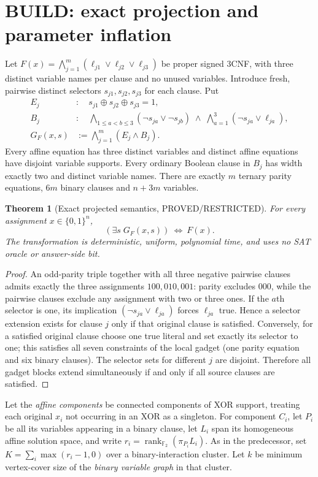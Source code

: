 \documentclass[11pt]{article}
\newtheorem{theorem}{Theorem}
\newcommand{\Ftwo}{\mathbb F_2}
\begin{document}
\section{BUILD: exact projection and parameter inflation}
Let $F(x)=\bigwedge_{j=1}^{m}(\ell_{j1}\lor\ell_{j2}\lor\ell_{j3})$ be proper signed 3CNF, with three distinct variable names per clause and no unused variables. Introduce fresh, pairwise distinct selectors $s_{j1},s_{j2},s_{j3}$ for each clause. Put
\begin{align}
E_j&:\quad s_{j1}\oplus s_{j2}\oplus s_{j3}=1,\\
B_j&:\quad\bigwedge_{1\le a<b\le3}(\neg s_{ja}\lor\neg s_{jb})
\;\land\;\bigwedge_{a=1}^{3}(\neg s_{ja}\lor\ell_{ja}),\\
G_F(x,s)&:=\bigwedge_{j=1}^{m}(E_j\land B_j).\label{eq:gadget}
\end{align}
Every affine equation has three distinct variables and distinct affine equations have disjoint variable supports. Every ordinary Boolean clause in $B_j$ has width exactly two and distinct variable names. There are exactly $m$ ternary parity equations, $6m$ binary clauses and $n+3m$ variables.

\begin{theorem}[Exact projected semantics, PROVED/RESTRICTED]\label{th:projection}
For every assignment $x\in\{0,1\}^n$,
\[
\boxed{\quad (\exists s\;G_F(x,s))\ \Longleftrightarrow\ F(x).\quad}
\]
The transformation is deterministic, uniform, polynomial time, and uses no SAT oracle or answer-side bit.
\end{theorem}
\begin{proof}
An odd-parity triple together with all three negative pairwise clauses admits exactly the three assignments $100,010,001$: parity excludes $000$, while the pairwise clauses exclude any assignment with two or three ones. If the $a$th selector is one, its implication $(\neg s_{ja}\lor\ell_{ja})$ forces $\ell_{ja}$ true. Hence a selector extension exists for clause $j$ only if that original clause is satisfied. Conversely, for a satisfied original clause choose one true literal and set exactly its selector to one; this satisfies all seven constraints of the local gadget (one parity equation and six binary clauses). The selector sets for different $j$ are disjoint. Therefore all gadget blocks extend simultaneously if and only if all source clauses are satisfied.
\end{proof}

Let the \emph{affine components} be connected components of XOR support, treating each original $x_i$ not occurring in an XOR as a singleton. For component $C_i$, let $P_i$ be all its variables appearing in a binary clause, let $L_i$ span its homogeneous affine solution space, and write $r_i=\operatorname{rank}_{\Ftwo}(\pi_{P_i}L_i)$. As in the predecessor, set $K=\sum_i\max(r_i-1,0)$ over a binary-interaction cluster. Let $k$ be minimum vertex-cover size of the \emph{binary variable graph} in that cluster.
\end{document}
